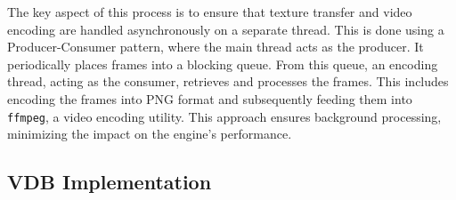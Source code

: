 The key aspect of this process is to ensure that texture transfer and video encoding are handled asynchronously on a separate thread. This is done using a Producer-Consumer pattern, where the main thread acts as the producer. It periodically places frames into a blocking queue. From this queue, an encoding thread, acting as the consumer, retrieves and processes the frames. This includes encoding the frames into PNG format and subsequently feeding them into \verb|ffmpeg|, a video encoding utility. This approach ensures background processing, minimizing the impact on the engine's performance.

\subsection{VDB Implementation}
